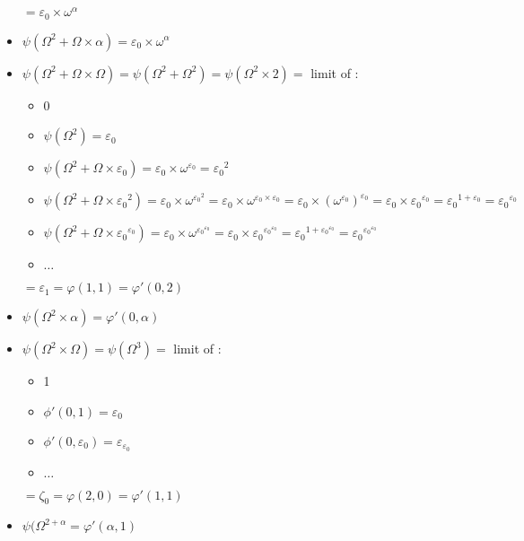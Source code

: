 \documentclass[10pt]{article}
\begin{document}
\begin{itemize}
\begin{itemize}
   \end{itemize}
   \( = \varepsilon_0 \times \omega^\alpha \)
\item \( \psi(\Omega^2+\Omega \times \alpha) = \varepsilon_0 \times \omega^\alpha \)
\item \( \psi(\Omega^2+\Omega \times \Omega) = \psi(\Omega^2+\Omega^2) = \psi(\Omega^2 \times 2) = \) limit of :
   \begin{itemize}
     \setlength{\itemsep}{1pt}
     \setlength{\parskip}{0pt}
     \setlength{\parsep}{0pt}
   \item  0
   \item \( \psi(\Omega^2) = \varepsilon_0 \)
   \item \( \psi(\Omega^2+\Omega \times \varepsilon_0) = \varepsilon_0 \times \omega^{\varepsilon_0} = {\varepsilon_0}^2 \)
   \item \( \psi(\Omega^2+\Omega \times {\varepsilon_0}^2) = \varepsilon_0 \times \omega ^{{\varepsilon_0}^2} = \varepsilon_0 \times \omega^{\varepsilon_0 \times \varepsilon_0} = \varepsilon_0 \times (\omega^{\varepsilon_0})^{\varepsilon_0} = \varepsilon_0 \times {\varepsilon_0}^{\varepsilon_0} = {\varepsilon_0}^{1+\varepsilon_0} = {\varepsilon_0}^{\varepsilon_0} \)
   \item \( \psi(\Omega^2+\Omega \times {\varepsilon_0}^{\varepsilon_0}) = \varepsilon_0 \times \omega^{{\varepsilon_0}^{\varepsilon_0}} = \varepsilon_0 \times {\varepsilon_0}^{{\varepsilon_0}^{\varepsilon_0}} = {\varepsilon_0}^{1+{\varepsilon_0}^{\varepsilon_0}} = {\varepsilon_0}^{{\varepsilon_0}^{\varepsilon_0}} \) 
   \item \( \ldots \)
   \end{itemize} 
   \( = \varepsilon_1 = \varphi(1,1) = \varphi'(0,2) \)
\item \( \psi(\Omega^2 \times \alpha) = \varphi'(0,\alpha) \)
\item \( \psi(\Omega^2 \times \Omega) = \psi(\Omega^3) = \) limit of : 
   \begin{itemize}
     \setlength{\itemsep}{1pt}
     \setlength{\parskip}{0pt}
     \setlength{\parsep}{0pt}
   \item  1
   \item \( \phi'(0,1) = \varepsilon_0 \)
   \item \( \phi'(0,\varepsilon_0) = \varepsilon_{\varepsilon_0} \)
   \item \( \ldots \)
   \end{itemize} 
   \( = \zeta_0 = \varphi(2,0) = \varphi'(1,1) \)
\item \( \psi(\Omega^{2+\alpha} = \varphi'(\alpha,1) \)

\end{itemize}
\end{document}
